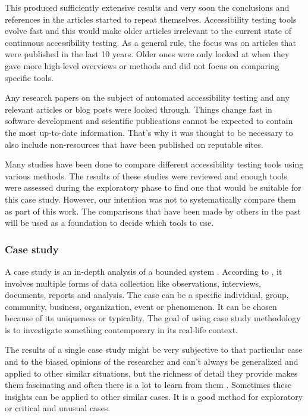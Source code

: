 \documentclass{master_thesis}
\begin{document}
This produced sufficiently extensive results and very soon the conclusions and references in the articles started to repeat themselves. Accessibility testing tools evolve fast and this would make older articles irrelevant to the current state of continuous accessibility testing. As a general rule, the focus was on articles that were published in the last 10 years. Older ones were only looked at when they gave more high-level overviews or methods and did not focus on comparing specific tools.

Any research papers on the subject of automated accessibility testing and any relevant articles or blog posts were looked through. Things change fast in software development and scientific publications cannot be expected to contain the most up-to-date information. That's why it was thought to be necessary to also include non-resources that have been published on reputable sites.

Many studies \citep{Alsaeedi2020, Ismailova2022, Sane2021, Vigo2013, RybinKoob2022, Duran2017} have been done to compare different accessibility testing tools using various methods. The results of these studies were reviewed and enough tools were assessed during the exploratory phase to find one that would be suitable for this case study. However, our intention was not to systematically compare them as part of this work. The comparisons that have been made by others in the past will be used as a foundation to decide which tools to use.

\subsubsection{Case study}

A case study is an in-depth analysis of a bounded system \citep{Range2023}. According to \citeauthor{Range2023}, it involves multiple forms of data collection like observations, interviews, documents, reports and analysis. The case can be a specific individual, group, community, business, organization, event or phenomenon. It can be chosen because of its uniqueness or typicality. The goal of using case study methodology is to investigate something contemporary in its real-life context.

The results of a single case study might be very subjective to that particular case and to the biased opinions of the researcher and can't always be generalized and applied to other similar situations, but the richness of detail they provide makes them fascinating and often there is a lot to learn from them \citep{Range2023}. Sometimes these insights can be applied to other similar cases. It is a good method for exploratory or critical and unusual cases.
\end{document}
